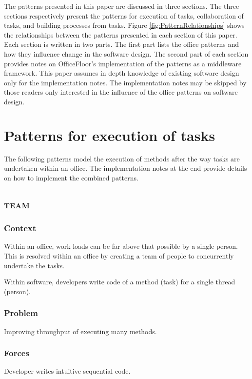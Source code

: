 \documentclass[prodmode]{style/acmlarge}
\begin{document}
The patterns presented in this paper are discussed in three sections.  The three
sections respectively present the patterns for execution of tasks, collaboration
of tasks, and building processes from tasks.  Figure
\ref{fig:PatternRelationships} shows the relationships between the patterns
presented in each section of this paper.  Each section is written in two parts. 
The first part lists the office patterns and how they influence change in the
software design.  The second part of each section provides notes on
OfficeFloor's implementation of the patterns as a middleware framework.  This
paper assumes in depth knowledge of existing software design only for the
implementation notes.  The implementation notes may be skipped by those readers
only interested in the influence of the office patterns on software design.



\section{Patterns for execution of tasks}

The following patterns model the execution of methods after the way tasks are
undertaken within an office.  The implementation notes at the end provide
details on how to implement the combined patterns.


\subsection{\textsc{\textbf{team}}}

\subsubsection*{Context} Within an office, work loads can be far above that
possible by a single person. This is resolved within an office by creating a
team of people to concurrently undertake the tasks.

Within software, developers write code of a method (task) for a single thread
(person).

\subsubsection*{Problem} Improving throughput of executing many methods.

\subsubsection*{Forces} Developer writes intuitive sequential code.
\end{document}
